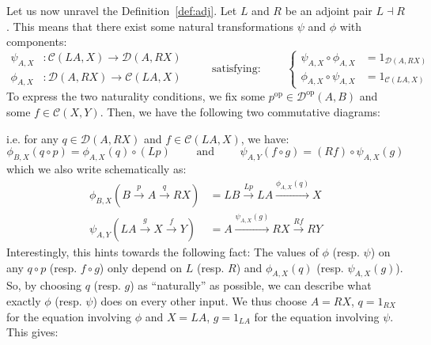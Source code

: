Let us now unravel the Definition~\ref{def:adj}. Let $L$ and $R$ be an adjoint pair $L\dashv R$. This means that there exist some natural transformations $\psi$ and $\phi$ with components:
\[\begin{aligned}
\psi_{A,X}&:\mathcal{C}(LA,X)\to\mathcal{D}(A,RX)\\[0.8em]
\phi_{A,X}&:\mathcal{D}(A,RX)\to\mathcal{C}(LA,X)
\end{aligned}\qquad\text{ satisfying: }\qquad
\left\{\begin{aligned}
\psi_{A,X}\circ\phi_{A,X}&=1_{\mathcal{D}(A,RX)}\\[0.8em]
\phi_{A,X}\circ\psi_{A,X}&=1_{\mathcal{C}(LA,X)}
\end{aligned}\right.\]
To express the two naturality conditions, we fix some $p^{\mathrm{op}}\in\mathcal{D}^{\mathrm{op}}(A,B)$ and some $f\in\mathcal{C}(X,Y)$. Then, we have the following two commutative diagrams:
\begin{center}
\end{center}
i.e. for any $q\in\mathcal{D}(A,RX)$ and $f\in\mathcal{C}(LA,X)$, we have:
\[\phi_{B,X}(q\circ p)=\phi_{A,X}(q)\circ(Lp)\qquad\text{ and }\qquad\psi_{A,Y}(f\circ g)=(Rf)\circ\psi_{A,X}(g)\]
which we also write schematically as:
\begin{align*}
\phi_{B,X}\left(B\overset{p}{\longrightarrow}A\overset{q}{\longrightarrow}RX\right)&=LB\overset{Lp}{\longrightarrow}LA\overset{\phi_{A,X}(q)}{\longrightarrow}X\\[1em]
\psi_{A,Y}\left(LA\overset{g}{\longrightarrow}X\overset{f}{\longrightarrow}Y\right)&=A\overset{\psi_{A,X}(g)}{\longrightarrow}RX\overset{Rf}{\longrightarrow}RY
\end{align*}
Interestingly, this hints towards the following fact: The values of $\phi$ (resp. $\psi$) on any $q\circ p$ (resp. $f\circ g$) only depend on $L$ (resp. $R$) and $\phi_{A,X}(q)$ (resp. $\psi_{A,X}(g)$). So, by choosing $q$ (resp. $g$) as ``naturally'' as possible, we can describe what exactly $\phi$ (resp. $\psi$) does on every other input. We thus choose $A=RX$, $q=1_{RX}$ for the equation involving $\phi$ and $X=LA$, $g=1_{LA}$ for the equation involving $\psi$. This gives:
